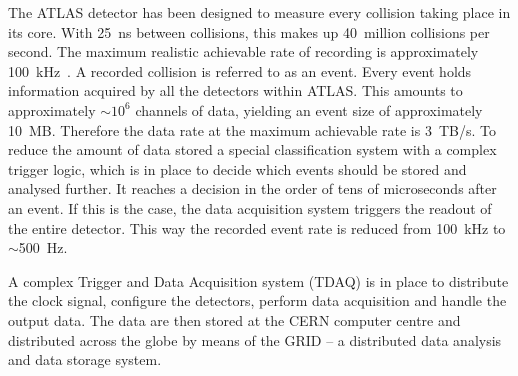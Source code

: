 The ATLAS detector has been designed to measure every collision taking place in its core. With 25~ns between collisions, this makes up 40~million collisions per second. The maximum realistic achievable rate of recording is approximately 100~kHz~\cite{}. A recorded collision is referred to as an event. Every event holds information acquired by all the detectors within ATLAS. This amounts to approximately $\sim$$10^6$ channels of data, yielding an event size of approximately 10~MB. Therefore the data rate at the maximum achievable rate is 3~TB/s. To reduce the amount of data stored a special classification system with a complex trigger logic, which is in place to decide which events should be stored and analysed further. It reaches a decision in the order of tens of microseconds after an event. If this is the case, the data acquisition system triggers the readout of the entire detector. This way the recorded event rate is reduced from 100~kHz to $\sim$500~Hz.

A complex Trigger and Data Acquisition system (TDAQ) is in place to distribute the clock signal, configure the detectors, perform data acquisition and handle the output data. The data are then stored at the CERN computer centre and distributed across the globe by means of the GRID -- a distributed data analysis and data storage system.



